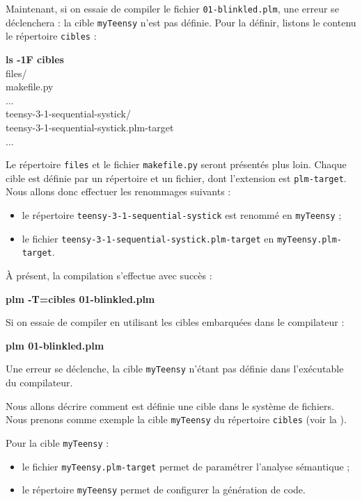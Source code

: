 Maintenant, si on essaie de compiler le fichier \texttt{01-blinkled.plm}, une erreur se déclenchera : la cible \texttt{myTeensy} n'est pas définie. Pour la définir, listons le contenu le répertoire \texttt{cibles} :
\begin{SHELL}
{\bfseries ls -1F cibles}\\
f{}iles/\\
makef{}ile.py\\
...\\
teensy-3-1-sequential-systick/\\
teensy-3-1-sequential-systick.plm-target\\
...
\end{SHELL}

Le répertoire \texttt{f{}iles} et le fichier \texttt{makef{}ile.py} seront présentés plus loin. Chaque cible est définie par un répertoire et un fichier, dont l'extension est \texttt{plm-target}. Nous allons donc effectuer les renommages suivants :
\begin{itemize}
  \item le répertoire \texttt{teensy-3-1-sequential-systick} est renommé en \texttt{myTeensy} ;
  \item le fichier \texttt{teensy-3-1-sequential-systick.plm-target} en \texttt{myTeensy.plm-target}.
\end{itemize}

À présent, la compilation s'effectue avec succès :
\begin{SHELL}
\bfseries plm -T=cibles 01-blinkled.plm
\end{SHELL}

Si on essaie de compiler en utilisant les cibles embarquées dans le compilateur :
\begin{SHELL}
\bfseries plm 01-blinkled.plm
\end{SHELL}

Une erreur se déclenche, la cible \texttt{myTeensy} n'étant pas définie dans l'exécutable du compilateur.







Nous allons décrire comment est définie une cible dans le système de fichiers. Nous prenons comme exemple la cible \texttt{myTeensy} du répertoire \texttt{cibles} (voir la ).

Pour la cible \texttt{myTeensy} :
\begin{itemize}
  \item le fichier \texttt{myTeensy.plm-target} permet de paramétrer l'analyse sémantique ;
  \item le répertoire \texttt{myTeensy} permet de configurer la génération de code.
\end{itemize}


